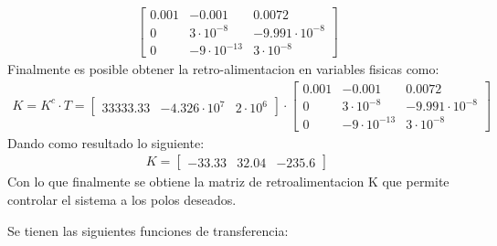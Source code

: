 \documentclass[
  11pt,
  letterpaper,
   addpoints,
   answers
  ]{exam}
\begin{document}
\begin{questions}
\begin{solution}
\begin{align}
            \begin{bmatrix}
                0.001 & -0.001 & 0.0072\\
                0 & 3 \cdot 10^{-8} & -9.991 \cdot 10^{-8}\\
                0 & -9 \cdot 10^{-13} & 3 \cdot 10^{-8}
            \end{bmatrix} 
        \end{align}
        Finalmente es posible obtener la retro-alimentacion en variables fisicas como:
        \begin{align}
            K= K^{c} \cdot T =
            \begin{bmatrix}
                33333.33 & -4.326 \cdot 10^{7} & 2 \cdot 10^{6}
            \end{bmatrix}
            \cdot
            \begin{bmatrix}
                0.001 & -0.001 & 0.0072\\
                0 & 3 \cdot 10^{-8} & -9.991 \cdot 10^{-8}\\
                0 & -9 \cdot 10^{-13} & 3 \cdot 10^{-8}
            \end{bmatrix}
        \end{align}
        Dando como resultado lo siguiente:
        \begin{align}
            K = 
            \begin{bmatrix}
                -33.33 & 32.04 & -235.6
            \end{bmatrix}
        \end{align}
        Con lo que finalmente se obtiene la matriz de retroalimentacion K que permite controlar el sistema a los polos deseados.
\end{solution}
    \question 
    Se tienen las siguientes funciones de transferencia:
    \begin{center}
\end{center}
\end{questions}
\end{document}

